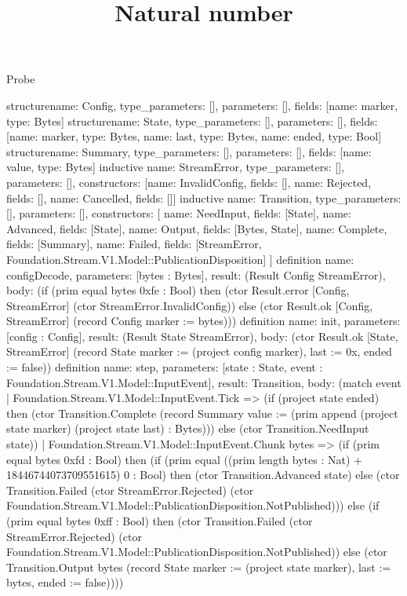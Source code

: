 \begin{lexlean}{Probe}
\title{Natural number}
\begin{semanticmodule}
structure{name: Config, type_parameters: [], parameters: [], fields: [{name: marker, type: Bytes}]}
structure{name: State, type_parameters: [], parameters: [], fields: [{name: marker, type: Bytes}, {name: last, type: Bytes}, {name: ended, type: Bool}]}
structure{name: Summary, type_parameters: [], parameters: [], fields: [{name: value, type: Bytes}]}
inductive{
  name: StreamError, type_parameters: [], parameters: [],
  constructors: [{name: InvalidConfig, fields: []}, {name: Rejected, fields: []}, {name: Cancelled, fields: []}]
}
inductive{
  name: Transition, type_parameters: [], parameters: [],
  constructors: [
    {name: NeedInput, fields: [State]},
    {name: Advanced, fields: [State]},
    {name: Output, fields: [Bytes, State]},
    {name: Complete, fields: [Summary]},
    {name: Failed, fields: [StreamError, Foundation.Stream.V1.Model::PublicationDisposition]}
  ]
}
definition{
  name: configDecode, parameters: [bytes : Bytes], result: (Result Config StreamError),
  body: (if (prim equal bytes 0xfe : Bool) then (ctor Result.error [Config, StreamError] (ctor StreamError.InvalidConfig)) else (ctor Result.ok [Config, StreamError] (record Config {marker := bytes})))
}
definition{
  name: init, parameters: [config : Config], result: (Result State StreamError),
  body: (ctor Result.ok [State, StreamError] (record State {marker := (project config marker), last := 0x, ended := false}))
}
definition{
  name: step, parameters: [state : State, event : Foundation.Stream.V1.Model::InputEvent], result: Transition,
  body: (match event
    | Foundation.Stream.V1.Model::InputEvent.Tick => (if (project state ended) then (ctor Transition.Complete (record Summary {value := (prim append (project state marker) (project state last) : Bytes)})) else (ctor Transition.NeedInput state))
    | Foundation.Stream.V1.Model::InputEvent.Chunk bytes => (if (prim equal bytes 0xfd : Bool) then (if (prim equal ((prim length bytes : Nat) + 18446744073709551615) 0 : Bool) then (ctor Transition.Advanced state) else (ctor Transition.Failed (ctor StreamError.Rejected) (ctor Foundation.Stream.V1.Model::PublicationDisposition.NotPublished))) else (if (prim equal bytes 0xff : Bool) then (ctor Transition.Failed (ctor StreamError.Rejected) (ctor Foundation.Stream.V1.Model::PublicationDisposition.NotPublished)) else (ctor Transition.Output bytes (record State {marker := (project state marker), last := bytes, ended := false}))))
}
\end{semanticmodule}
\end{lexlean}
